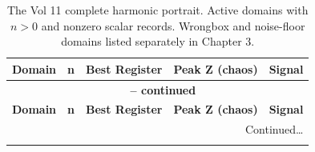\documentclass[11pt, letterpaper, openany]{book}
\begin{document}
\renewcommand{\arraystretch}{1.3}
\small
\begin{longtable}{|l|r|l|r|l|}
\caption{The Vol 11 complete harmonic portrait. Active domains with $n > 0$
and nonzero scalar records. Wrongbox and noise-floor domains listed separately
in Chapter 3.}
\label{tab:v11_full_portrait} \\
\hline
\rowcolor{kishblue!10}
\textbf{Domain} & \textbf{n} & \textbf{Best Register} & \textbf{Peak Z (chaos)} & \textbf{Signal} \\
\hline\hline
\endfirsthead
\multicolumn{5}{c}{{\bfseries \tablename\ \thetable{} -- continued}} \\
\hline
\rowcolor{kishblue!10}
\textbf{Domain} & \textbf{n} & \textbf{Best Register} & \textbf{Peak Z (chaos)} & \textbf{Signal} \\
\hline\hline
\endhead
\hline \multicolumn{5}{|r|}{{Continued\ldots}} \\ \hline
\endfoot
\endlastfoot


\end{longtable}
\end{document}
